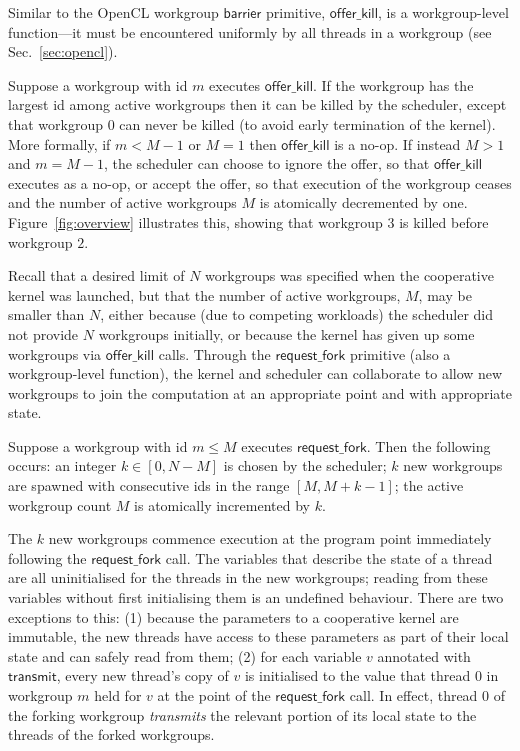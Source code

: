 \documentclass[sigconf]{acmart}
\newcommand{\myfiglong}{Figure~}
\newcommand{\mysec}{Sec.~}
\newcommand{\transmit}{\mathsf{transmit}}
\newcommand{\offerfork}{\mathsf{request\_fork}}
\newcommand{\offerkill}{\mathsf{offer\_kill}}
\begin{document}
{Similar to the OpenCL workgroup $\mathsf{barrier}$ primitive,
$\offerkill$, is a workgroup-level function---it must be encountered
uniformly by all threads in a workgroup (see
\mysec\ref{sec:opencl}).

Suppose a workgroup with id $m$ executes $\offerkill$.  If the
workgroup has the largest id among active workgroups then it
can be killed by the scheduler, except that workgroup 0 can never be
killed (to avoid early termination of the kernel).  More formally, if $m < M-1$ or $M=1$ then $\offerkill$ is a
no-op.  If instead $M > 1$ and $m = M-1$, the scheduler can choose to
ignore the offer, so that $\offerkill$ executes as a no-op, or accept
the offer, so that execution of the workgroup ceases and the number of
active workgroups $M$ is atomically decremented by one.
\myfiglong{\ref{fig:overview}} illustrates this, showing that
workgroup $3$ is killed before workgroup $2$.


\myparagraph{Semantics for $\offerfork$}
%
Recall that a desired limit of $N$ workgroups was specified when the
cooperative kernel was launched, but that the number of active
workgroups, $M$, may be smaller than $N$, either because (due to
competing workloads) the scheduler did not provide $N$ workgroups
initially, or because the kernel has given up some workgroups via
$\offerkill$ calls.  Through the $\offerfork$ primitive (also a
workgroup-level function), the kernel and scheduler can collaborate to
allow new workgroups to join the computation at an appropriate point
and with appropriate state.

Suppose a workgroup with id $m\leq M$ executes $\offerfork$.  Then the
following occurs: an integer $k \in [0, N-M]$ is chosen by the
scheduler; $k$ new workgroups are spawned with consecutive ids in the
range $[M, M+k-1]$; the active workgroup count $M$ is atomically
incremented by $k$.

The $k$ new workgroups commence execution at the program point
immediately following the $\offerfork$ call.  The variables that
describe the state of a thread are all uninitialised for the threads
in the new workgroups; reading from these variables without first
initialising them is an undefined behaviour.  There are two exceptions
to this: (1) because the parameters to a cooperative kernel are
immutable, the new threads have access to these parameters as part of
their local state and can safely read from them; (2) for each variable
$v$ annotated with $\transmit$, every new thread's copy of $v$ is
initialised to the value that thread 0 in workgroup $m$ held for $v$
at the point of the $\offerfork$ call.
%
In effect, thread 0 of the forking workgroup \emph{transmits} the relevant
portion of its local state to the threads of the forked workgroups.

}
\end{document}
